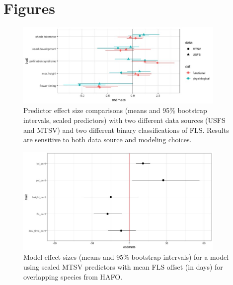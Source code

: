 \documentclass{article}\usepackage[]{graphicx}\usepackage[]{color}
\begin{document}
\begin{center}
\begin{tabular}{|c|l|}
\end{tabular}
\end{center}


\pagebreak

\section*{Figures}

\begin{figure}[here]
\includegraphics[width=0.9\textwidth]{..//figures/Data_comparision_plot.jpeg}
\caption{Predictor effect size comparisons (means and 95\% bootstrap intervals, scaled predictors) with two different data sources (USFS and MTSV) and two different binary classifications of FLS. Results are sensitive to both data source and modeling choices. }
\label{fig:Figure 1}
\end{figure}

\begin{center}
\begin{figure}[here]
\includegraphics[width=0.9\textwidth]{..//figures/HF_continuous_scaled_mode.jpeg} %
\caption{Model effect sizes (means and 95\% bootstrap intervals) for a model using scaled MTSV predictors with mean FLS offset (in days) for overlapping species from HAFO.}
\label{fig:Figure 2}
\end{figure}
\end{center}
\end{document}
